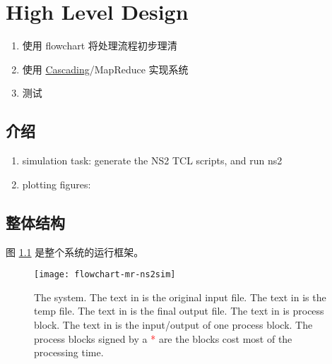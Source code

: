 %

\chapter{High Level Design}



\begin{enumerate}
  \item 使用 flowchart 将处理流程初步理清
  \item 使用 \href{http://www.cascading.org/}{Cascading}/MapReduce 实现系统
  \item 测试
\end{enumerate}


\section{介绍}

\begin{enumerate}
  \item simulation task:
  generate the NS2 TCL scripts, and run ns2

  \item plotting figures:
  
\end{enumerate}


\section{整体结构}
图 \ref{fig:system} 是整个系统的运行框架。

\begin{figure}\centering
  \texttt{[image: flowchart-mr-ns2sim]}
  \caption{The system.
    The text in  is the original input file.
    The text in  is the temp file.
    The text in  is the final output file.
    The text in  is process block.
    The text in  is the input/output of one process block.
The process blocks signed by a \textcolor[HTML]{FF0000}{*} are the blocks cost most of the processing time.
  }\label{fig:system}
\end{figure}

